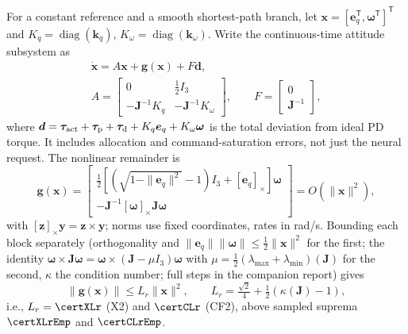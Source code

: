 \documentclass[letterpaper, 10 pt, conference]{ieeeconf}
\newcommand{\T}{^{\mathsf T}}
\begin{document}
For a constant reference and a smooth shortest-path branch, let
$\bm x=[\bm e_q\T,\bm\omega\T]\T$ and
$K_q=\operatorname{diag}(\bm k_q)$, $K_\omega=\operatorname{diag}(\bm k_\omega)$.
Write the continuous-time attitude subsystem as
\begin{equation}
 \begin{gathered}
 \dot{\bm x}=A\bm x+\bm g(\bm x)+F\bm d,\\
 A=\begin{bmatrix}0&\frac12I_3\\-\bm J^{-1}K_q&-\bm J^{-1}K_\omega\end{bmatrix},
 \qquad F=\begin{bmatrix}0\\\bm J^{-1}\end{bmatrix},
 \end{gathered}
 \label{eq:localmodel}
\end{equation}
where $\bm d=\bm\tau_{\rm act}+\bm\tau_{\rm p}+\bm\tau_{\rm d}
 +K_q\bm e_q+K_\omega\bm\omega$ is the total deviation from ideal PD torque.
It includes allocation and command-saturation errors, not just the neural
request. The nonlinear remainder is
\begin{equation}
 \bm g(\bm x)=\begin{bmatrix}
 \tfrac12[(\sqrt{1-\|\bm e_q\|^2}-1)I_3+[\bm e_q]_\times]\bm\omega\\
 -\bm J^{-1}[\bm\omega]_\times\bm J\bm\omega
 \end{bmatrix}=O(\|\bm x\|^2),
 \label{eq:localremainder}
\end{equation}
with $[\bm z]_\times\bm y=\bm z\times\bm y$; norms use fixed coordinates,
rates in rad/s. Bounding each block separately (orthogonality and
$\|\bm e_q\|\|\bm\omega\|\le\frac12\|\bm x\|^2$ for the first; the identity
$\bm\omega\times\bm J\bm\omega=\bm\omega\times(\bm J-\mu I_3)\bm\omega$ with
$\mu=\frac12(\lambda_{\max}+\lambda_{\min})(\bm J)$ for the second, $\kappa$
the condition number; full steps in the companion report) gives
\begin{equation}
 \|\bm g(\bm x)\|\le L_r\|\bm x\|^2,\qquad
 L_r=\tfrac{\sqrt2}{4}+\tfrac12(\kappa(\bm J)-1),
 \label{eq:Lr}
\end{equation}
i.e., $L_r=\certXLr$ (X2) and $\certCLr$ (CF2), above sampled suprema
$\certXLrEmp$ and $\certCLrEmp$.
\end{document}
